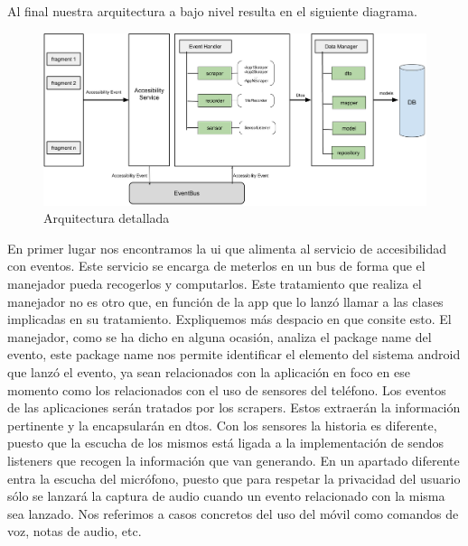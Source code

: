\documentclass[12pt,a4paper,oneside]{book} %
\begin{document}
\newline
\newline
Al final nuestra arquitectura a bajo nivel resulta en el siguiente diagrama. 
\begin{figure}[H]
		\includegraphics[width=1.3\textwidth,center]{pictures/architecture/arquitecturaGeneral03.png} 
	\caption[Arquitectura detallada]{Arquitectura detallada}
\end{figure}
En primer lugar nos encontramos la ui que alimenta al servicio de accesibilidad con eventos. Este servicio se encarga de meterlos en un bus de forma que el manejador pueda recogerlos y computarlos. 
\newline \newline
Este tratamiento que realiza el manejador no es otro que, en función de la app que lo lanzó llamar a las clases implicadas en su tratamiento.
\newline \newline
Expliquemos más despacio en que consite esto. El manejador, como se ha dicho en alguna ocasión, analiza el package name del evento, este package name nos permite identificar el elemento del sistema android que lanzó el evento, ya sean relacionados con la aplicación en foco en ese momento como los relacionados con el uso de sensores del teléfono. 
\newline \newline
Los eventos de las aplicaciones serán tratados por los scrapers. Estos extraerán la información pertinente y la encapsularán en dtos. 
\newline \newline
Con los sensores la historia es diferente, puesto que la escucha de los mismos está ligada a la implementación de sendos listeners que recogen la información que van generando. En un apartado diferente entra la escucha del micrófono, puesto que para respetar la privacidad del usuario sólo se lanzará la captura de audio cuando un evento relacionado con la misma sea lanzado. Nos referimos a casos concretos del uso del móvil como comandos de voz, notas de audio, etc. 
\end{document}
